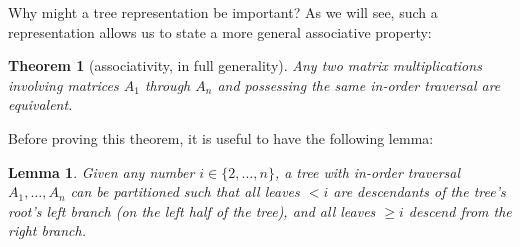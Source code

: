 \documentclass[draft,12pt]{report}
\newtheorem{theorem}{Theorem}
\newtheorem{lemma}{Lemma}
\begin{document}
Why might a tree representation be important? As we will see, such a representation allows us to state a more general associative property:
\begin{theorem}[associativity, in full generality]
    Any two matrix multiplications involving matrices $A_1$ through $A_n$ and possessing the same in-order traversal are equivalent.
\end{theorem}
\noindent
Before proving this theorem, it is useful to have the following lemma:

\begin{lemma}
    Given any number $i \in \{2, \ldots, n\}$, a tree with in-order traversal $\allowbreak A_1, \ldots, A_n$ can be partitioned such that all leaves $< i$ are descendants of the tree's root's left branch (on the left half of the tree), and all leaves $\geq i$ descend from the right branch.
\end{lemma}
\end{document}
